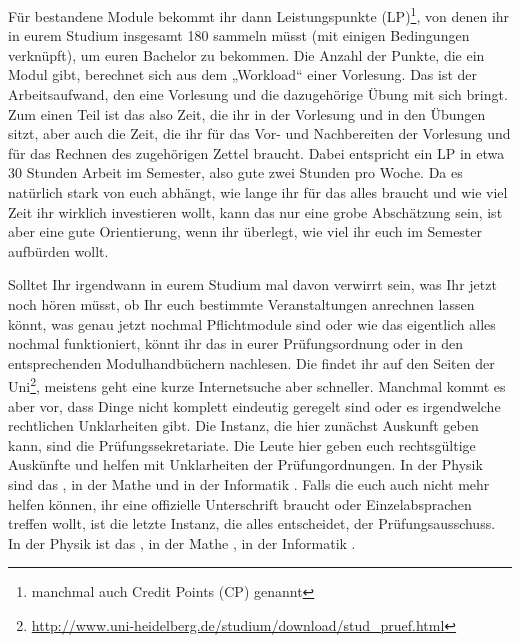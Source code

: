Für bestandene Module bekommt ihr dann Leistungspunkte (\gls{LP})\footnote{manchmal auch Credit Points (\gls{CP}) genannt}, von denen ihr in eurem Studium insgesamt 180 sammeln müsst (mit einigen Bedingungen verknüpft), um euren Bachelor zu bekommen. Die Anzahl der Punkte, die ein Modul gibt, berechnet sich aus dem „Workload“ einer Vorlesung. Das ist der Arbeitsaufwand, den eine Vorlesung und die dazugehörige Übung mit sich bringt. Zum einen Teil ist das also Zeit, die ihr in der Vorlesung und in den Übungen sitzt, aber auch die Zeit, die ihr für das Vor- und Nachbereiten der Vorlesung und für das Rechnen des zugehörigen Zettel braucht. Dabei entspricht ein \gls{LP} in etwa 30 Stunden Arbeit im Semester, also gute zwei Stunden pro Woche. Da es natürlich stark von euch abhängt, wie lange ihr für das alles braucht und wie viel Zeit ihr wirklich investieren wollt, kann das nur eine grobe Abschätzung sein, ist aber eine gute Orientierung, wenn ihr überlegt, wie viel ihr euch im Semester aufbürden wollt.

Solltet Ihr irgendwann in eurem Studium mal davon verwirrt sein, was Ihr jetzt noch hören müsst, ob Ihr euch bestimmte Veranstaltungen anrechnen lassen könnt, was genau jetzt nochmal Pflichtmodule sind oder wie das eigentlich alles nochmal funktioniert, könnt ihr das in eurer Prüfungsordnung oder in den entsprechenden Modulhandbüchern nachlesen. Die findet ihr auf den Seiten der Uni\footnote{\url{http://www.uni-heidelberg.de/studium/download/stud_pruef.html}}, meistens geht eine kurze Internetsuche aber schneller. Manchmal kommt es aber vor, dass Dinge nicht komplett eindeutig geregelt sind oder es irgendwelche rechtlichen Unklarheiten gibt. Die Instanz, die hier zunächst Auskunft geben kann, sind die Prüfungssekretariate. Die Leute hier geben euch rechtsgültige Auskünfte und helfen mit Unklarheiten der Prüfungordnungen. In der Physik sind das \pruefsekphysik, in der Mathe \pruefsekmathe und in der Informatik \pruefsekinfo. Falls die euch auch nicht mehr helfen können, ihr eine offizielle Unterschrift braucht oder Einzelabsprachen treffen wollt, ist die letzte Instanz, die alles entscheidet, der Prüfungsausschuss. In der Physik ist das \pruefausschussvorsitzphysik, in der Mathe \pruefausschussvorsitzmathe, in der Informatik \pruefausschussvorsitzinformatik.
